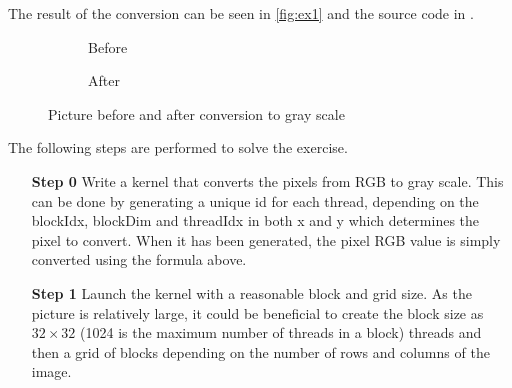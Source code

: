 \noindent The result of the conversion can be seen in \autoref{fig:ex1} and the source code in \cite{exercises}.
\begin{figure}[ht]
	\centering
	\begin{subfigure}{.5\textwidth}
		\centering
		\caption{Before}
		\label{fig:ex1-before}
	\end{subfigure}%
	\begin{subfigure}{.5\textwidth}
		\centering
		\caption{After}
		\label{fig:ex1-after}
	\end{subfigure}
	\caption{Picture before and after conversion to gray scale}
	\label{fig:ex1}
\end{figure}
The following steps are performed to solve the exercise.
\begin{enumerate}
	\item[\textbf{Step 0}]
	Write a kernel that converts the pixels from RGB to gray scale.
	This can be done by generating a unique id for each thread, depending on the blockIdx, blockDim and threadIdx in both x and y which determines the pixel to convert.
	When it has been generated, the pixel RGB value is simply converted using the formula above.
	\item[\textbf{Step 1}]
	Launch the kernel with a reasonable block and grid size.
	As the picture is relatively large, it could be beneficial to create the block size as $32\times32$ (1024 is the maximum number of threads in a block) threads and then a grid of blocks depending on the number of rows and columns of the image.
\end{enumerate}